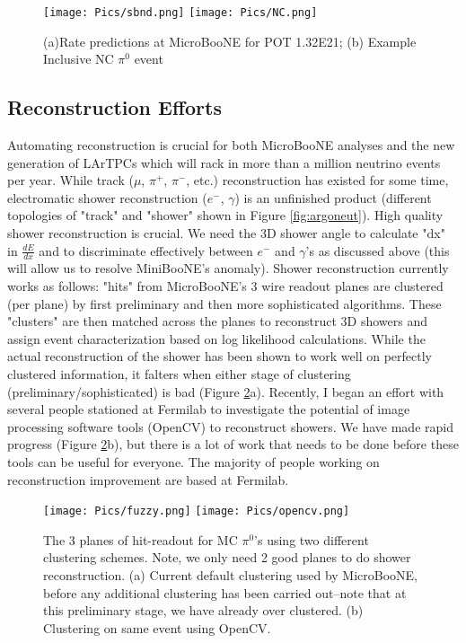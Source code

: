 \documentclass[12pt]{article}
\begin{document}
\begin{figure}[h!]
\centering
\texttt{[image: Pics/sbnd.png]}
\hspace{.5 cm}
\texttt{[image: Pics/NC.png]}
\caption{(a)Rate predictions at MicroBooNE for POT 1.32E21; (b) Example Inclusive NC $\pi^0$ event  }
\label{fig:CCNC}
\end{figure}


\subsection{Reconstruction Efforts}
Automating reconstruction is crucial for both MicroBooNE analyses and the new generation of LArTPCs which will rack in more than a million neutrino events per year. While track ($\mu$, $\pi^+$, $\pi^-$, etc.) reconstruction has existed for some time, electromatic shower reconstruction ($e^-$, $\gamma$) is an unfinished product (different topologies of "track" and "shower" shown in Figure \ref{fig:argoneut}). High quality shower reconstruction is crucial. We need the 3D shower angle to calculate "dx" in $\frac{dE}{dx}$ and to discriminate effectively between $e^-$ and $\gamma$'s as discussed above (this will allow us to resolve MiniBooNE's anomaly). Shower reconstruction currently works as follows: "hits" from MicroBooNE's 3 wire readout planes are clustered (per plane) by first preliminary and then more sophisticated algorithms. These "clusters" are then matched across the planes to reconstruct 3D showers and assign event characterization based on log likelihood calculations. While the actual reconstruction of the shower has been shown to work well on perfectly clustered information, it falters when either stage of clustering (preliminary/sophisticated) is bad (Figure \ref{fig:fuzzy}a). Recently, I began an effort with several people stationed at Fermilab to investigate the potential of image processing software tools (OpenCV) to reconstruct showers. We have made rapid progress (Figure \ref{fig:fuzzy}b), but there is a lot of work that needs to be done before these tools can be useful for everyone. The majority of people working on reconstruction improvement are based at Fermilab. 

\begin{figure}[h!]
\centering
\texttt{[image: Pics/fuzzy.png]}
\hspace{.5 cm}
\texttt{[image: Pics/opencv.png]}
\caption{The 3 planes of hit-readout for MC $\pi^0$'s using two different clustering schemes. Note, we only need 2 good planes to do shower reconstruction.  (a) Current default clustering used by MicroBooNE, before any additional clustering has been carried out--note that at this preliminary stage, we have already over clustered. (b) Clustering on same event using OpenCV.}
\label{fig:fuzzy}
\end{figure}
\end{document}
